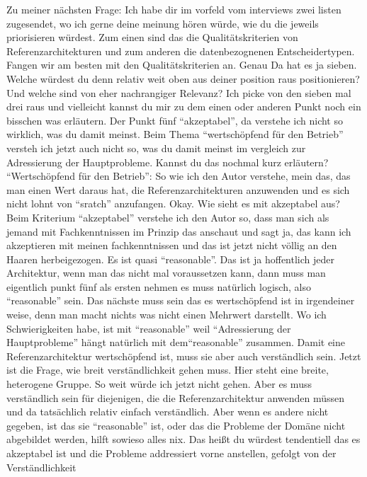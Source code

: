 \LF	 Zu meiner nächsten Frage: Ich habe dir im vorfeld vom interviews zwei listen zugesendet, wo ich gerne deine meinung hören würde, wie du die jeweils priorisieren würdest. Zum einen sind das die Qualitätskriterien von Referenzarchitekturen und zum anderen die datenbezognenen Entscheidertypen. Fangen wir am besten mit den Qualitätskriterien an.
\PA	 Genau
\LF	Da hat es ja sieben. Welche würdest du denn relativ weit oben aus deiner position raus positionieren? Und welche sind von eher nachrangiger Relevanz?
\PA	Ich picke von den sieben mal drei raus und vielleicht kannst du mir zu dem einen oder anderen Punkt noch ein bisschen was erläutern. Der Punkt fünf \enquote{akzeptabel}, da verstehe ich nicht so wirklich, was du damit meinst. Beim  Thema \enquote{wertschöpfend für den Betrieb} versteh ich jetzt auch nicht so, was du damit meinst im vergleich zur Adressierung der Hauptprobleme. Kannst du das nochmal kurz erläutern?
\LF	\enquote{Wertschöpfend für den Betrieb}: So wie ich den Autor verstehe, mein das, das man einen Wert daraus hat, die Referenzarchitekturen anzuwenden und es sich nicht lohnt von \enquote{sratch} anzufangen.
\PA	 Okay. Wie sieht es mit akzeptabel aus?
\LF	Beim Kriterium \enquote{akzeptabel} verstehe ich den Autor so, dass man sich als jemand mit Fachkenntnissen im Prinzip das anschaut und sagt ja, das kann ich akzeptieren mit meinen fachkenntnissen und das ist jetzt nicht völlig an den Haaren herbeigezogen. Es ist quasi \enquote{reasonable}.
\PA	Das ist ja hoffentlich jeder Architektur, wenn man das nicht mal voraussetzen kann, dann muss man eigentlich punkt fünf als ersten nehmen es muss natürlich logisch, also \enquote{reasonable} sein. Das nächste muss sein das es wertschöpfend ist in irgendeiner weise, denn man macht nichts was nicht einen Mehrwert darstellt. Wo ich Schwierigkeiten habe, ist mit \enquote{reasonable}  weil \enquote{Adressierung der Hauptprobleme} hängt natürlich mit dem\enquote{reasonable} zusammen. Damit eine Referenzarchitektur wertschöpfend ist, muss sie aber auch verständlich sein. Jetzt ist die Frage, wie breit verständlichkeit gehen muss. Hier steht eine breite, heterogene Gruppe. So weit würde ich jetzt nicht gehen. Aber es muss verständlich sein für diejenigen, die die Referenzarchitektur anwenden müssen und da tatsächlich relativ einfach verständlich. Aber wenn es andere nicht gegeben, ist das sie \enquote{reasonable} ist, oder das die Probleme der Domäne nicht abgebildet werden, hilft sowieso alles nix.
\LF	 Das heißt du würdest tendentiell das es akzeptabel ist und die Probleme addressiert vorne anstellen, gefolgt von der Verständlichkeit
